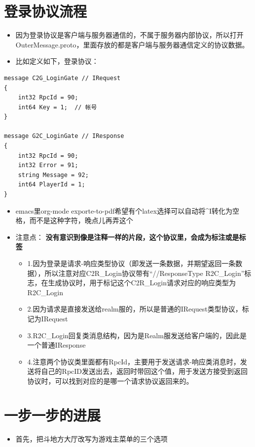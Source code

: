\documentclass[9pt, b5paper]{article}
\begin{document}
\section{登录协议流程}
\label{sec-3}
\begin{itemize}
\item 因为登录协议是客户端与服务器通信的，不属于服务器内部协议，所以打开OuterMessage.proto，里面存放的都是客户端与服务器通信定义的协议数据。
\item 比如定义如下，登录协议：
\end{itemize}
\begin{verbatim}
message C2G_LoginGate // IRequest
{
	int32 RpcId = 90;
	int64 Key = 1;	// 帐号
}

message G2C_LoginGate // IResponse
{
	int32 RpcId = 90;
	int32 Error = 91;
	string Message = 92;
	int64 PlayerId = 1;
}
\end{verbatim}
\begin{itemize}
\item emacs里org-mode exporte-to-pdf希望有个latex选择可以自动将\^{}I转化为空格，而不是这种字符，晚点儿再弄这个
\item 注意点： \textbf{没有意识到像是注释一样的片段，这个协议里，会成为标注或是标签}
\begin{itemize}
\item 1.因为登录是请求-响应类型协议（即发送一条数据，并期望返回一条数据），所以注意对应C2R\_Login协议带有“//ResponseType R2C\_Login”标志，在生成协议时，用于标记这个C2R\_Login请求对应的响应类型为R2C\_Login
\item 2.因为请求是直接发送给realm服的，所以是普通的IRequest类型协议，标记为IRequest
\item 3.R2C\_Login回复类消息结构，因为是Realm服发送给客户端的，因此是一个普通IResponse
\item 4.注意两个协议类里面都有RpcId，主要用于发送请求-响应类消息时，发送将自己的RpcID发送出去，返回时带回这个值，用于发送方接受到返回协议时，可以找到对应的是哪一个请求协议返回来的。
\end{itemize}
\end{itemize}

\section{一步一步的进展　}
\label{sec-4}
\begin{itemize}
\item 首先，把斗地方大厅改写为游戏主菜单的三个选项
\end{itemize}
\end{document}
